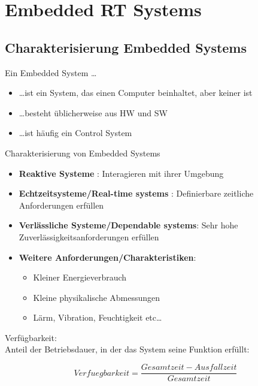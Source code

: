 \section{Embedded RT Systems }
\subsection{Charakterisierung Embedded Systems }
Ein Embedded System \ldots
\begin{itemize}
  \item \ldots ist ein System, das einen Computer beinhaltet, aber keiner ist
  \item \ldots besteht üblicherweise aus HW und SW
  \item \ldots ist häufig ein Control System\\
\end{itemize}
Charakterisierung von Embedded Systems
  \begin{itemize}
    \item \textbf{Reaktive Systeme} : Interagieren mit ihrer Umgebung
    \item \textbf{Echtzeitsysteme/Real-time systems} : Definierbare zeitliche
    Anforderungen erfüllen
    \item \textbf{Verlässliche Systeme/Dependable systems}: Sehr hohe
    Zuverlässigkeitsanforderungen erfüllen
    \item \textbf{Weitere Anforderungen/Charakteristiken}: 
    \begin{itemize}
      \item Kleiner Energieverbrauch
      \item Kleine physikalische Abmessungen
      \item Lärm, Vibration, Feuchtigkeit etc\ldots
    \end{itemize}
  \end{itemize}

Verfügbarkeit: \\ 
Anteil der Betriebsdauer, in  der das System seine Funktion
erfüllt: 

\begin{equation}
Verfuegbarkeit = \frac{Gesamtzeit-Ausfallzeit}{Gesamtzeit}
\end{equation}

